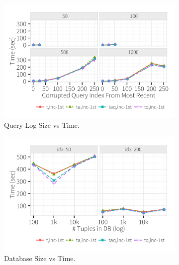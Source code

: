   \begin{figure}[h]
    \centering
    \begin{subfigure}[t]{.3\textwidth}
      \includegraphics[width = \columnwidth]{figures/logsize_time}
      \vspace*{-.1in}
      \caption{Query Log Size vs Time.}
      \label{f:logsize_time} 
    \end{subfigure}
    \begin{subfigure}[t]{.3\textwidth}
      \includegraphics[width = \columnwidth]{figures/dbsize_time}
      \vspace*{-.1in}
      \caption{Database Size vs Time.}
      \label{f:dbsize_time} 
    \end{subfigure}
    \begin{subfigure}[t]{.3\textwidth}

\end{subfigure}
\end{figure}
